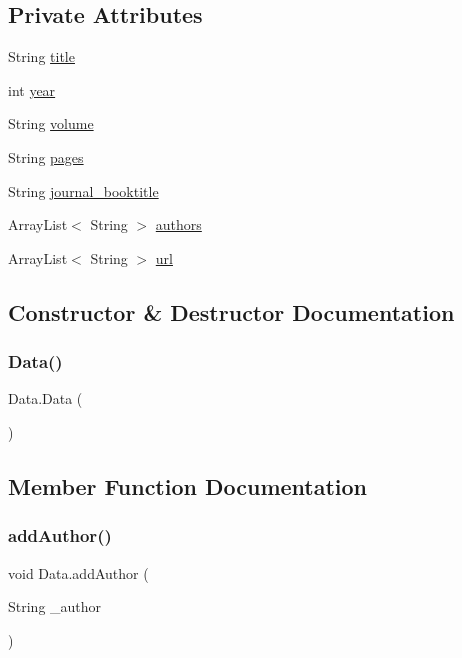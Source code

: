 \subsection*{Private Attributes}
\begin{DoxyCompactItemize}
\item 
String \hyperlink{class_data_adcd725740eb6c1b70d03d51bcdaa4fc4}{title}
\item 
int \hyperlink{class_data_ab4b8026b8e14d7b834aa265bf1221cae}{year}
\item 
String \hyperlink{class_data_aaf6320f6222ab00af52f1cd0d0c301e6}{volume}
\item 
String \hyperlink{class_data_a7fa32ce168de5abce2bb00f3e1f4e23b}{pages}
\item 
String \hyperlink{class_data_affdd242bc2e170a80620fb91c075ced9}{journal\+\_\+booktitle}
\item 
Array\+List$<$ String $>$ \hyperlink{class_data_ae6e0036466319e383caab1ad88fdb5b6}{authors}
\item 
Array\+List$<$ String $>$ \hyperlink{class_data_a41462839c5b625313952cf2155da2175}{url}
\end{DoxyCompactItemize}


\subsection{Constructor \& Destructor Documentation}
\hypertarget{class_data_ac9188dcb0fca3b16e8111ce3ee5c2a1c}{}\label{class_data_ac9188dcb0fca3b16e8111ce3ee5c2a1c} 
\subsubsection{\texorpdfstring{Data()}{Data()}}
{\footnotesize\ttfamily Data.\+Data (\begin{DoxyParamCaption}{ }\end{DoxyParamCaption})}



\subsection{Member Function Documentation}
\hypertarget{class_data_aee77b766926cff5acb486c8993c39607}{}\label{class_data_aee77b766926cff5acb486c8993c39607} 
\subsubsection{\texorpdfstring{add\+Author()}{addAuthor()}}
{\footnotesize\ttfamily void Data.\+add\+Author (\begin{DoxyParamCaption}\item[{String}]{\+\_\+author }\end{DoxyParamCaption})}

